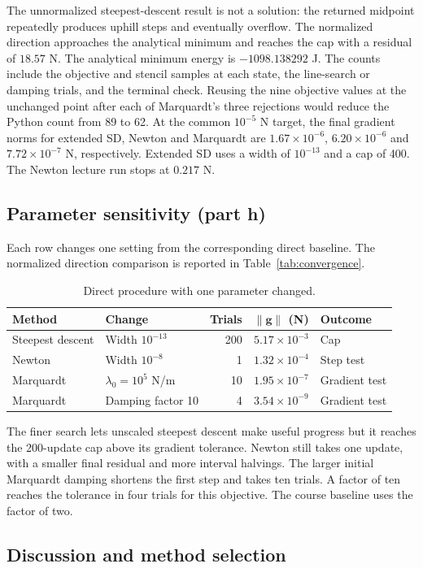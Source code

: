 \documentclass[11pt,a4paper]{article}
\begin{document}
The unnormalized steepest-descent result is not a solution: the returned
midpoint repeatedly produces uphill steps and eventually overflow. The
normalized direction approaches the analytical minimum and reaches the cap
with a residual of $18.57$ N.
The analytical minimum energy is $-1098.138292$ J. The counts include the objective and stencil samples at each state,
the line-search or damping trials, and the terminal check. Reusing the
nine objective values at the unchanged point after each of Marquardt's
three rejections would reduce the Python count from 89 to 62. At the common $10^{-5}$ N target,
the final gradient norms for extended SD, Newton and Marquardt are
$1.67\times10^{-6}$, $6.20\times10^{-6}$ and $7.72\times10^{-7}$ N,
respectively. Extended SD uses a width of $10^{-13}$ and a cap of 400.
The Newton lecture run stops at $0.217$ N.

\clearpage
\subsection{Parameter sensitivity (part h)}
Each row changes one setting from the corresponding direct baseline.
The normalized direction comparison is reported in Table~\ref{tab:convergence}.
\begin{table}[H]
\centering
\caption{Direct procedure with one parameter changed.}
\begin{tabular}{llrrl}
\toprule
Method & Change & Trials & $\|\bm g\|$ (N) & Outcome\\
\midrule
Steepest descent & Width $10^{-13}$ & 200 & $5.17\times10^{-3}$ & Cap\\
Newton & Width $10^{-8}$ & 1 & $1.32\times10^{-4}$ & Step test\\
Marquardt & $\lambda_0=10^5$ N/m & 10 & $1.95\times10^{-7}$ & Gradient test\\
Marquardt & Damping factor 10 & 4 & $3.54\times10^{-9}$ & Gradient test\\
\bottomrule
\end{tabular}
\end{table}
The finer search lets unscaled steepest descent make useful progress but
it reaches the 200-update cap above its gradient tolerance. Newton still
takes one update, with a smaller final residual and more interval halvings.
The larger initial Marquardt damping shortens the first step and takes
ten trials. A factor of ten reaches the tolerance in four trials for
this objective. The course baseline uses the factor of two.

\subsection{Discussion and method selection}
\end{document}
